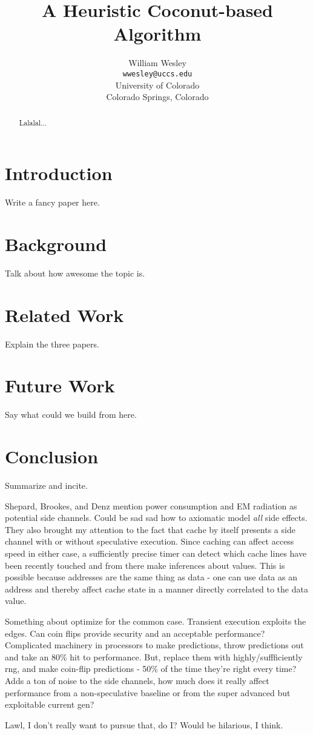 \documentclass[11pt,conference]{IEEEtran}
\title{A Heuristic Coconut-based Algorithm}
\author{William Wesley \\
\texttt{wwesley@uccs.edu} \\
University of Colorado \\
Colorado Springs, Colorado}
\begin{document}
\maketitle

\begin{abstract}
Lalalal...
\end{abstract}

\section{Introduction}
Write a fancy paper here\cite{mosier2022}.
\section{Background}
Talk about how awesome the topic is.
\section{Related Work}
Explain the three papers.\cite{canella2019} \cite{cats2022}
\section{Future Work}
Say what could we build from here.
\section{Conclusion}
Summarize and incite.

Shepard, Brookes, and Denz \cite{shepherd2022transient} mention power consumption and EM radiation as potential side channels.
Could be sad sad how to axiomatic model \emph{all} side effects.
They also brought my attention to the fact that cache by itself presents a side channel with or without speculative execution.
Since caching can affect access speed in either case, a sufficiently precise timer can detect which cache lines have been recently touched and from there make inferences about values.
This is possible because addresses are the same thing as data - one can use data as an address and thereby affect cache state in a manner directly correlated to the data value.

Something about optimize for the common case.
Transient execution exploits the edges.
Can coin flips provide security and an acceptable performance?
Complicated machinery in processors to make predictions, throw predictions out and take an 80\% hit to performance.
But, replace them with highly/suffficiently rng, and make coin-flip predictions - 50\% of the time they're right every time?
Adds a ton of noise to the side channels, how much does it really affect performance from a non-speculative baseline or from the super advanced but exploitable current gen?

Lawl, I don't really want to pursue that, do I?
Would be hilarious, I think.



\end{document}
